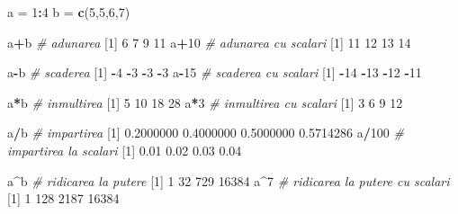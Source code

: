 \documentclass[]{article}
\newenvironment{Shaded}{\begin{snugshade}}{\end{snugshade}}
\newcommand{\KeywordTok}[1]{\textcolor[rgb]{0.13,0.29,0.53}{\textbf{#1}}}
\newcommand{\DecValTok}[1]{\textcolor[rgb]{0.00,0.00,0.81}{#1}}
\newcommand{\FloatTok}[1]{\textcolor[rgb]{0.00,0.00,0.81}{#1}}
\newcommand{\StringTok}[1]{\textcolor[rgb]{0.31,0.60,0.02}{#1}}
\newcommand{\CommentTok}[1]{\textcolor[rgb]{0.56,0.35,0.01}{\textit{#1}}}
\newcommand{\OperatorTok}[1]{\textcolor[rgb]{0.81,0.36,0.00}{\textbf{#1}}}
\newcommand{\NormalTok}[1]{#1}
\begin{document}
\begin{Shaded}
\begin{Highlighting}[]
\NormalTok{a =}\StringTok{ }\DecValTok{1}\OperatorTok{:}\DecValTok{4}
\NormalTok{b =}\StringTok{ }\KeywordTok{c}\NormalTok{(}\DecValTok{5}\NormalTok{,}\DecValTok{5}\NormalTok{,}\DecValTok{6}\NormalTok{,}\DecValTok{7}\NormalTok{)}

\NormalTok{a}\OperatorTok{+}\NormalTok{b  }\CommentTok{# adunarea }
\NormalTok{[}\DecValTok{1}\NormalTok{]  }\DecValTok{6}  \DecValTok{7}  \DecValTok{9} \DecValTok{11}
\NormalTok{a}\OperatorTok{+}\DecValTok{10} \CommentTok{# adunarea cu scalari}
\NormalTok{[}\DecValTok{1}\NormalTok{] }\DecValTok{11} \DecValTok{12} \DecValTok{13} \DecValTok{14}

\NormalTok{a}\OperatorTok{-}\NormalTok{b  }\CommentTok{# scaderea}
\NormalTok{[}\DecValTok{1}\NormalTok{] }\OperatorTok{-}\DecValTok{4} \OperatorTok{-}\DecValTok{3} \OperatorTok{-}\DecValTok{3} \OperatorTok{-}\DecValTok{3}
\NormalTok{a}\OperatorTok{-}\DecValTok{15} \CommentTok{# scaderea cu scalari}
\NormalTok{[}\DecValTok{1}\NormalTok{] }\OperatorTok{-}\DecValTok{14} \OperatorTok{-}\DecValTok{13} \OperatorTok{-}\DecValTok{12} \OperatorTok{-}\DecValTok{11}

\NormalTok{a}\OperatorTok{*}\NormalTok{b }\CommentTok{# inmultirea}
\NormalTok{[}\DecValTok{1}\NormalTok{]  }\DecValTok{5} \DecValTok{10} \DecValTok{18} \DecValTok{28}
\NormalTok{a}\OperatorTok{*}\DecValTok{3} \CommentTok{# inmultirea cu scalari}
\NormalTok{[}\DecValTok{1}\NormalTok{]  }\DecValTok{3}  \DecValTok{6}  \DecValTok{9} \DecValTok{12}

\NormalTok{a}\OperatorTok{/}\NormalTok{b }\CommentTok{# impartirea}
\NormalTok{[}\DecValTok{1}\NormalTok{] }\FloatTok{0.2000000} \FloatTok{0.4000000} \FloatTok{0.5000000} \FloatTok{0.5714286}
\NormalTok{a}\OperatorTok{/}\DecValTok{100} \CommentTok{# impartirea la scalari}
\NormalTok{[}\DecValTok{1}\NormalTok{] }\FloatTok{0.01} \FloatTok{0.02} \FloatTok{0.03} \FloatTok{0.04}

\NormalTok{a}\OperatorTok{^}\NormalTok{b }\CommentTok{# ridicarea la putere}
\NormalTok{[}\DecValTok{1}\NormalTok{]     }\DecValTok{1}    \DecValTok{32}   \DecValTok{729} \DecValTok{16384}
\NormalTok{a}\OperatorTok{^}\DecValTok{7} \CommentTok{# ridicarea la putere cu scalari}
\NormalTok{[}\DecValTok{1}\NormalTok{]     }\DecValTok{1}   \DecValTok{128}  \DecValTok{2187} \DecValTok{16384}
\end{Highlighting}
\end{Shaded}
\end{document}
